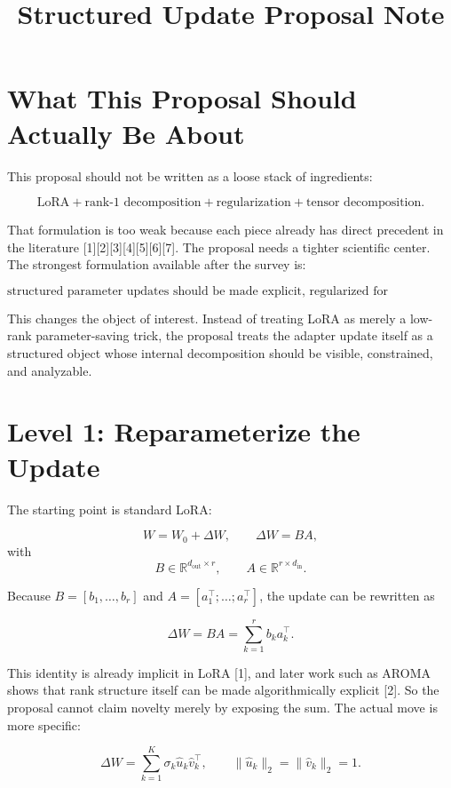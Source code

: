 \documentclass[11pt]{article}
\title{Structured Update Proposal Note}
\date{}
\begin{document}
\maketitle

\section{What This Proposal Should Actually Be About}

This proposal should not be written as a loose stack of ingredients:

\[
\text{LoRA} + \text{rank-1 decomposition} + \text{regularization} + \text{tensor decomposition}.
\]

That formulation is too weak because each piece already has direct precedent in the literature [1][2][3][4][5][6][7]. The proposal needs a tighter scientific center. The strongest formulation available after the survey is:

\[
\text{structured parameter updates should be made explicit, regularized for identifiability, and solved at the component level.}
\]

This changes the object of interest. Instead of treating LoRA as merely a low-rank parameter-saving trick, the proposal treats the adapter update itself as a structured object whose internal decomposition should be visible, constrained, and analyzable.

\section{Level 1: Reparameterize the Update}

The starting point is standard LoRA:

\[
W = W_0 + \Delta W, \qquad \Delta W = BA,
\]
with
\[
B \in \mathbb{R}^{d_{\text{out}} \times r}, \qquad
A \in \mathbb{R}^{r \times d_{\text{in}}}.
\]

Because $B=[b_1,\dots,b_r]$ and $A=[a_1^\top;\dots;a_r^\top]$, the update can be rewritten as

\[
\Delta W = BA = \sum_{k=1}^{r} b_k a_k^\top.
\]

This identity is already implicit in LoRA [1], and later work such as AROMA shows that rank structure itself can be made algorithmically explicit [2]. So the proposal cannot claim novelty merely by exposing the sum. The actual move is more specific:

\[
\Delta W = \sum_{k=1}^{K} \sigma_k \hat{u}_k \hat{v}_k^\top,
\qquad
\|\hat{u}_k\|_2 = \|\hat{v}_k\|_2 = 1.
\]
\end{document}
